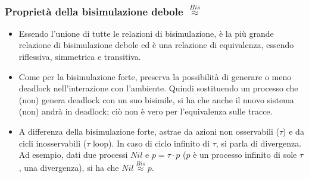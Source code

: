 \subsubsection{Proprietà della bisimulazione debole \texorpdfstring{$\stackrel{Bis}{\approx}$}{}}
\begin{itemize}
    \item Essendo l’unione di tutte le relazioni di bisimulazione, è la più grande relazione di bisimulazione debole ed è una relazione di equivalenza, essendo     riflessiva, simmetrica e transitiva.
    \item Come per la bisimulazione forte, preserva la possibilità di generare o meno deadlock nell’interazione con l’ambiente.
    Quindi sostituendo un processo che (non) genera deadlock con un suo bisimile, si ha che anche il nuovo sistema (non) andrà in deadlock; ciò non è vero per l’equivalenza sulle tracce.
    \item A differenza della bisimulazione forte, astrae da azioni non osservabili ($\tau$) e da cicli inosservabili ($\tau$ loop). 
    In caso di ciclo infinito di $\tau$, si parla di divergenza. Ad esempio, dati due processi $Nil$ e $p=\tau\cdot p$ ($p$ è un processo infinito di sole $\tau$, una divergenza), si ha che $Nil \stackrel{Bis}{\approx} p$.
\end{itemize}

